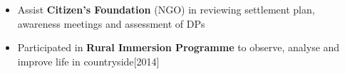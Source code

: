 \documentclass{article}
\newcommand{\xfilll}[2][1ex]{
\dimen0=#2\advance\dimen0 by #1
\leaders\hrule height \dimen0 depth -#1\hfill}
\begin{document}
\begin{itemize}[itemsep = -2pt, leftmargin=*]
	\item Assist \textbf{Citizen's Foundation} (NGO) in reviewing settlement plan, awareness meetings and assessment of DPs
	\item Participated in \textbf{Rural Immersion Programme} to observe, analyse and improve life in countryside\hfill{[2014]}
%
%
\end{itemize}

%
\end{document}
